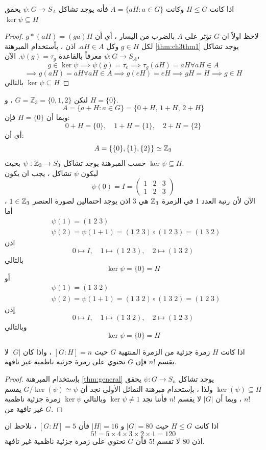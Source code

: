 \begin{theorem}
	\label{thm:general}
		اذا كانت $H\le G$ وكانت $A = \{aH : a\in G\}$ فأنه يوجد تشاكل $\psi : G\to S_A$ يحقق
	$\ker\psi \subseteq H$
\end{theorem}
\begin{proof}
	لاحظ اولاً ان $G$ تؤثر على $A$ بالضرب من اليسار ، أي أن 
	$g* (aH) = (ga) H$ لكل $g\in H$ وكل $aH\in A$. اذن ، بأستخدام المبرهنة \ref{thm:ch3thm1} يوجد تشاكل
	$\psi : G \to S_A$ معرفاً بالقاعدة $\psi(g) = \tau_g$. الآن،
	\[
	g\in \ker\psi \implies \psi(g) = \tau_e \implies \tau_g(aH) = aH \forall aH\in A
	\]
	\[
	\implies g(aH) = aH \forall aH\in A \implies g(eH) = eH \implies gH = H\implies g\in H
	\]
	بالتالي $\ker\psi \subseteq H$
	
\end{proof}
\newpage
\begin{example}
	لتكن $G = \mathbb{Z}_3 = \{0,1,2\}$ ، و $H = \{0\}$.
	\[
	A = \{a + H : a \in G\} = \{0+H,\, 1+H,\, 2+H\}
	\]
	وبما أن $H = \{0\}$ فإن:
	\[
	0+H = \{0\}, \quad 1+H = \{1\}, \quad 2+H = \{2\}
	\]
	أي أن:
	\[
	A = \{\{0\}, \{1\}, \{2\}\} \simeq \mathbb{Z}_3
	\]
	حسب المبرهنة يوجد تشاكل 
	$\psi : \mathbb{Z}_3 \to S_3$ بحيث $\ker\psi \subseteq H$.\\
	ليكون $\psi$ تشاكل ، يجب ان يكون
	\[
	\psi(0) = I = 
	\begin{pmatrix}
		1&2&3\\
		1&2&3
	\end{pmatrix}
	\]
	الآن لأن رتبة العدد 1 في الزمرة $\mathbb{Z}_3 $ هي 3 اذن يوجد احتمالين لصورة العنصر $1\in \mathbb{Z}_3 $ ، أما
	\begin{align*}
		&\psi(1) = (1\; 2\; 3)\\
		&\psi(2) = \psi(1 + 1) = (1\; 2\; 3)\circ (1\; 2\; 3) = (1\; 3\; 2)
	\end{align*}
	اذن
	\[
	0 \mapsto I, \quad 1 \mapsto (1\;2\;3), \quad 2\mapsto (1\;3\;2)
	\]
	بالتالي
	\[
	\ker\psi = \{0\} = H
	\]
أو
	\begin{align*}
		&\psi(1) = (1\; 3\; 2)\\
		&\psi(2) = \psi(1 + 1) = (1\; 3\; 2)\circ (1\; 3\; 2) = (1\; 2\; 3)
	\end{align*}
	إذن
	\[
	0 \mapsto I, \quad 1 \mapsto (1\;3\;2), \quad 2\mapsto (1\;2\;3)
	\]
	وبالتالي
	\[
	\ker\psi = \{0\} = H
	\]
\end{example}


\begin{theorem}
	اذا كانت $H$ زمرة جزئية من الزمرة المنتهية $G$ حيث
	$[G : H] =n$ ، واذا كان $|G|$ لا يقسم $n!$
	\linebreak فإن $G$ تحتوي على زمرة جزئية ناظمية غير تافهة.
\end{theorem}
\begin{proof}
	بإستخدام المبرهنة \ref{thm:general} يوجد تشاكل $\psi : G\to S_n$ يحقق
	$\ker(\psi) \subseteq H$ ولذا ، بإستخدام مبرهنة التماثل الأولى نجد أن
	$G / \ker(\psi) \simeq \psi$ يقسم $n!$ ، وبما أن $|G|$ لا يقسم $n!$ فأننا نجد $\ker\psi \neq 1$ وبالتالي $\ker\psi$ زمرة جزئية ناظمية غير تافهة من $G$.
\end{proof}

\begin{example}
	اذا كانت 
	$H \le G$ حيث $|G| = 80$ و $|H| = 16$ فأن $[G : H] = 5$ ، نلاحظ ان
	\[
	5! = 5\times4\times3\times2\times1 = 120
	\] 
	اذن $80$ لا تقسم $5!$ فأن $G$ تحتوي على زمرة جزئية ناظمية غير تافهة.
\end{example}


